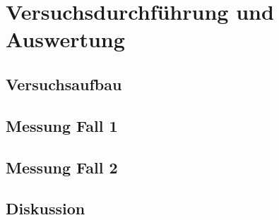 \chapter*{Versuchsdurchführung und Auswertung}
\setcounter{chapter}{2}

\section{Versuchsaufbau}

\section{Messung Fall 1}

\section{Messung Fall 2}

\section{Diskussion}